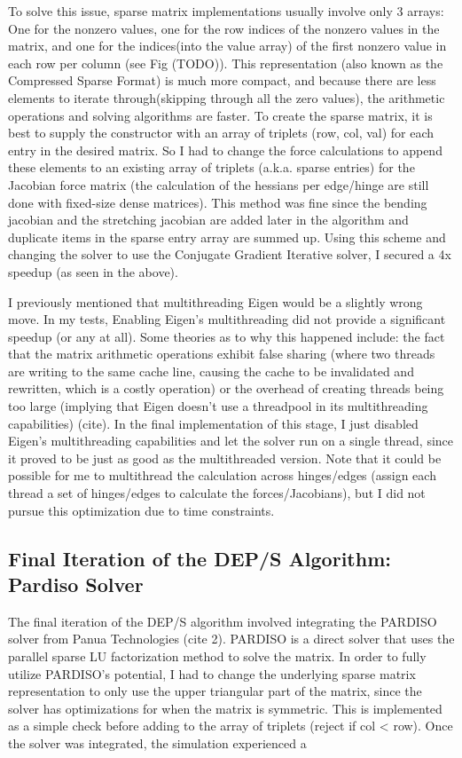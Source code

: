 \documentclass[letterpaper, 10 pt, conference]{ieeeconf}  %
\begin{document}
To solve this issue, sparse matrix implementations usually involve only 3 arrays: One for the nonzero values, one for the row indices of the nonzero values in the matrix, and one for the indices(into the value array) of the first nonzero value in each row per column (see Fig (TODO)). This representation (also known as the Compressed Sparse Format) is much more compact, and because there are less elements to iterate through(skipping through all the zero values), the arithmetic operations and solving algorithms are faster. To create the sparse matrix, it is best to supply the constructor with an array of triplets (row, col, val) for each entry in the desired matrix. So I had to change the force calculations to append these elements to an existing array of triplets (a.k.a. sparse entries) for the Jacobian force matrix (the calculation of the hessians per edge/hinge are still done with fixed-size dense matrices). This method was fine since the bending jacobian and the stretching jacobian are added later in the algorithm and duplicate items in the sparse entry array are summed up. Using this scheme and changing the solver to use the Conjugate Gradient Iterative solver, I secured a 4x speedup (as seen in the above).



I previously mentioned that multithreading Eigen would be a slightly wrong move. In my tests, Enabling Eigen's multithreading did not provide a significant speedup (or any at all). Some theories as to why this happened include: the fact that the matrix arithmetic operations exhibit false sharing (where two threads are writing to the same cache line, causing the cache to be invalidated and rewritten, which is a costly operation) or the overhead of creating threads being too large (implying that Eigen doesn't use a threadpool in its multithreading capabilities) (cite). In the final implementation of this stage, I just disabled Eigen's multithreading capabilities and let the solver run on a single thread, since it proved to be just as good as the multithreaded version. Note that it could be possible for me to multithread the calculation across hinges/edges (assign each thread a set of hinges/edges to calculate the forces/Jacobians), but I did not pursue this optimization due to time constraints.

\subsection{Final Iteration of the DEP/S Algorithm: Pardiso Solver}
The final iteration of the DEP/S algorithm involved integrating the PARDISO solver from Panua Technologies (cite 2). PARDISO is a direct solver that uses the parallel sparse LU factorization method to solve the matrix. In order to fully utilize PARDISO's potential, I had to change the underlying sparse matrix representation to only use the upper triangular part of the matrix, since the solver has optimizations for when the matrix is symmetric. This is implemented as a simple check before adding to the array of triplets (reject if col < row). Once the solver was integrated, the simulation experienced a 
\end{document}
